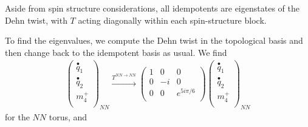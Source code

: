 Aside from spin structure considerations, all idempotents are eigenstates of the Dehn twist,
with $T$ acting diagonally within each spin-structure block. 




To find the eigenvalues, we compute the Dehn twist in the topological basis and then change back to the idempotent basis as usual. 
We find
\begin{align}
\left( \begin{matrix}
\stackrel{\bullet}{q}_{1}\\
\stackrel{\bullet}{q}_{2}\\
m_4^+ \\ 
\end{matrix} \right)_{NN} \xrightarrow{T^{NN\rightarrow NN}}
\left( \begin{matrix} 
1 & 0&0 \\
0 & -i & 0 \\
0 & 0& e^{5 i \pi /6}\\
\end{matrix} \right) 
\left( \begin{matrix}
\stackrel{\bullet}{q}_{1}\\
\stackrel{\bullet}{q}_{2}\\
m_4^+ \\ 
\end{matrix} \right)_{NN}
\end{align}
for the $NN$ torus, and 

